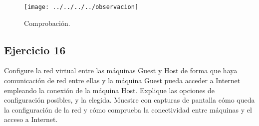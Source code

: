 \documentclass[a4paper, 11pt]{article} %
\begin{document}
\begin{figure}[htpb]
\texttt{[image: ../../../../observacion]}
\caption{Comprobación.}
\end{figure}



\subsection*{Ejercicio 16}
Configure la red virtual entre las máquinas Guest y Host de forma que
haya comunicación de red entre ellas y la máquina Guest pueda acceder a Internet
empleando la conexión de la máquina Host. Explique las opciones de configuración
posibles, y la elegida. Muestre con capturas de pantalla cómo queda la configuración
de la red y cómo comprueba la conectividad entre máquinas y el acceso a Internet.
\end{document}

